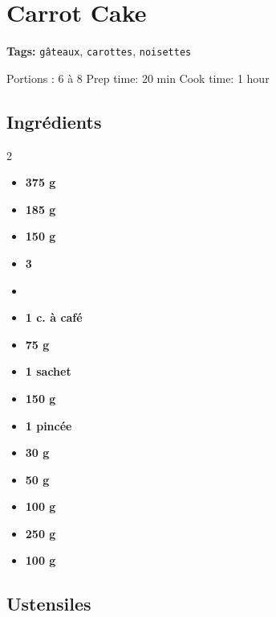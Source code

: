 \chapter*{Carrot Cake}

\textbf{Tags:} \texttt{gâteaux}, \texttt{carottes}, \texttt{noisettes}

\begin{center}
Portions : 6 à 8 \quad Prep time: 20 min \quad Cook time: 1 hour
\end{center}

\section*{Ingrédients}

\begin{multicols}{2}
\begin{itemize}[leftmargin=*]
\item \textbf{375 g} 
\item \textbf{185 g} 
\item \textbf{150 g} 
\item \textbf{3} 
\item {}
\item \textbf{1 c. à café} 
\item \textbf{75 g} 
\item \textbf{1 sachet} 
\item \textbf{150 g} 
\item \textbf{1 pincée} 
\item \textbf{30 g} 
\item \textbf{50 g} 
\item \textbf{100 g} 
\item \textbf{250 g} 
\item \textbf{100 g} 
\end{itemize}
\end{multicols}

\section*{Ustensiles}

